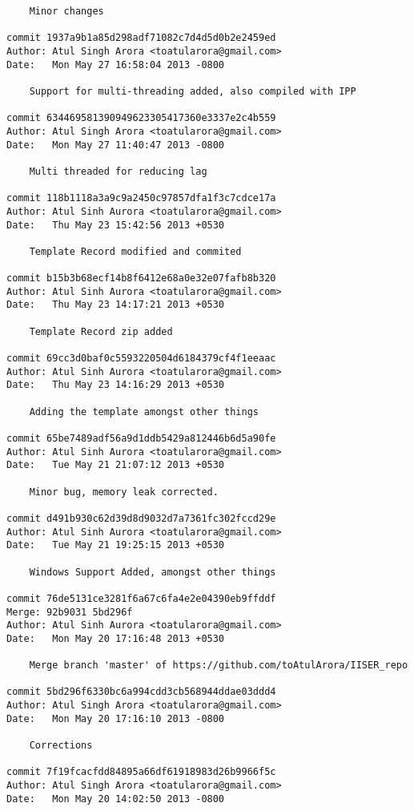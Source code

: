 \begin{lstlisting}
    Minor changes

commit 1937a9b1a85d298adf71082c7d4d5d0b2e2459ed
Author: Atul Singh Arora <toatularora@gmail.com>
Date:   Mon May 27 16:58:04 2013 -0800

    Support for multi-threading added, also compiled with IPP

commit 634469581390949623305417360e3337e2c4b559
Author: Atul Singh Arora <toatularora@gmail.com>
Date:   Mon May 27 11:40:47 2013 -0800

    Multi threaded for reducing lag

commit 118b1118a3a9c9a2450c97857dfa1f3c7cdce17a
Author: Atul Sinh Aurora <toatularora@gmail.com>
Date:   Thu May 23 15:42:56 2013 +0530

    Template Record modified and commited

commit b15b3b68ecf14b8f6412e68a0e32e07fafb8b320
Author: Atul Sinh Aurora <toatularora@gmail.com>
Date:   Thu May 23 14:17:21 2013 +0530

    Template Record zip added

commit 69cc3d0baf0c5593220504d6184379cf4f1eeaac
Author: Atul Sinh Aurora <toatularora@gmail.com>
Date:   Thu May 23 14:16:29 2013 +0530

    Adding the template amongst other things

commit 65be7489adf56a9d1ddb5429a812446b6d5a90fe
Author: Atul Sinh Aurora <toatularora@gmail.com>
Date:   Tue May 21 21:07:12 2013 +0530

    Minor bug, memory leak corrected.

commit d491b930c62d39d8d9032d7a7361fc302fccd29e
Author: Atul Sinh Aurora <toatularora@gmail.com>
Date:   Tue May 21 19:25:15 2013 +0530

    Windows Support Added, amongst other things

commit 76de5131ce3281f6a67c6fa4e2e04390eb9ffddf
Merge: 92b9031 5bd296f
Author: Atul Sinh Aurora <toatularora@gmail.com>
Date:   Mon May 20 17:16:48 2013 +0530

    Merge branch 'master' of https://github.com/toAtulArora/IISER_repo

commit 5bd296f6330bc6a994cdd3cb568944ddae03ddd4
Author: Atul Singh Arora <toatularora@gmail.com>
Date:   Mon May 20 17:16:10 2013 -0800

    Corrections

commit 7f19fcacfdd84895a66df61918983d26b9966f5c
Author: Atul Singh Arora <toatularora@gmail.com>
Date:   Mon May 20 14:02:50 2013 -0800


\end{lstlisting}
